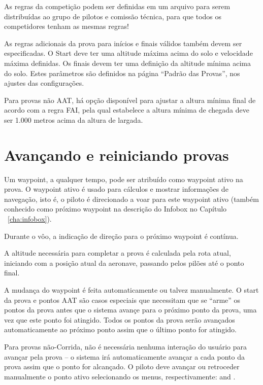 \tip As regras da competição podem ser definidas em um arquivo para serem distribuídas ao grupo de pilotos e comissão técnica, para que todos os competidores tenham as mesmas regras!

As regras adicionais da prova para inícios e finais válidos também devem ser especificadas.  O Start deve ter uma altitude máxima acima do solo e velocidade máxima definidas.  Os finais devem ter uma definição da altitude mínima acima do solo.  Estes parâmetros são definidos na página “Padrão das Provas”, nos ajustes das configurações.

Para provas não AAT, há opção disponível para ajustar a altura mínima final de acordo com a regra FAI, pela qual estabelece a altura mínima de chegada deve ser 1.000 metros acima da altura de largada.




\section{Avançando e reiniciando provas}\label{sec:advanc-rest-tasks}
Um waypoint, a qualquer tempo, pode ser atribuído como waypoint ativo na prova.  O waypoint ativo é usado para cálculos e mostrar informações de navegação, isto é, o piloto é direcionado a voar para este waypoint ativo (também conhecido como próximo waypoint na descrição do Infobox no Capítulo ~\ref{cha:infobox}).

Durante o vôo, a indicação de direção para o próximo waypoint é contínua.

A altitude necessária para completar a prova é calculada pela rota atual, iniciando com a posição atual da aeronave, passando pelos pilões até o ponto final.

A mudança do waypoint é feita automaticamente ou talvez manualmente.  O start da prova e pontos AAT são casos especiais que necessitam que se “arme” os pontos da prova antes que o sistema avançe para o próximo ponto da prova, uma vez que este ponto foi atingido.  Todos os pontos da prova serão avançados automaticamente ao próximo ponto assim que o último ponto for atingido.

Para provas não-Corrida, não é necessária nenhuma interação do usuário para avançar pela prova – o sistema irá automaticamente avançar a cada ponto da prova assim que o ponto for alcançado.  O piloto deve avançar ou retroceder manualmente o ponto ativo selecionando os menus, respectivamente:
 \blink{} and
\blink{}.

